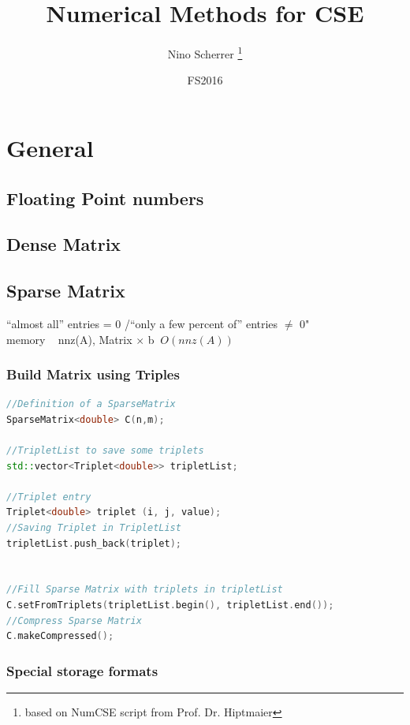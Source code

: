 \documentclass[12pt, a4paper]{article}
\title{Numerical Methods for CSE}
\author{Nino Scherrer \thanks{based on NumCSE script from Prof. Dr. Hiptmaier}}
\date{FS2016}
\begin{document}
\begin{titlepage}
\maketitle
\end{titlepage}
 
 
\section{General}

\subsection{Floating Point numbers}

\subsection{Dense Matrix}


\subsection{Sparse Matrix}
“almost all” entries = 0 /“only a few percent of” entries $\not =$ 0"\\
memory ~ nnz(A), Matrix $\times$ b $~ O(nnz(A))$

\subsubsection{Build Matrix using Triples}

\begin{lstlisting}[language=C++, caption=Triplet example]
//Definition of a SparseMatrix
SparseMatrix<double> C(n,m);

//TripletList to save some triplets
std::vector<Triplet<double>> tripletList;

//Triplet entry
Triplet<double> triplet (i, j, value); 	 
//Saving Triplet in TripletList
tripletList.push_back(triplet);


//Fill Sparse Matrix with triplets in tripletList
C.setFromTriplets(tripletList.begin(), tripletList.end());
//Compress Sparse Matrix
C.makeCompressed();
\end{lstlisting}

\subsubsection{Special storage formats}
\end{document}
